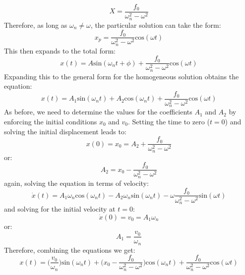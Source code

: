 \documentclass[12pt,letter]{article}
\numberwithin{ex}{section} %
\numberwithin{re}{section} %
\numberwithin{vcs}{section} %
\begin{document}
			\begin{equation}
				X = \frac{f_0}{\omega_n^2-\omega^2}
				\label{eq:X}
			\end{equation}		
			Therefore, as long as $\omega_n \neq \omega$, the particular solution can take the form:
			\begin{equation}
				x_p = \frac{f_0}{\omega_n^2-\omega^2}\text{cos}(\omega t)
			\end{equation}						
			This then expands to the total form:
			\begin{equation}
				x(t) = A\text{sin}(\omega_n t + \phi) + \frac{f_0}{\omega_n^2-\omega^2}\text{cos}(\omega t)
			\end{equation}				
			Expanding this to the general form for the homogeneous solution obtains the equation:
			\begin{equation}
				x(t) = A_1\text{sin}(\omega_n t) + A_2\text{cos}(\omega_n t) + \frac{f_0}{\omega_n^2-\omega^2}\text{cos}(\omega t)
			\end{equation}				
			As before, we need to determine the values for the coefficients $A_1$ and $A_2$ by enforcing the initial conditions $x_0$ and $v_0$. Setting the time to zero ($t=0$) and solving the initial displacement leads to:
			\begin{equation}
				x(0) = x_0 = A_2 + \frac{f_0}{\omega_n^2-\omega^2}
			\end{equation}				
			or:
			\begin{equation}
				A_2 = x_0-\frac{f_0}{\omega_n^2-\omega^2}
			\end{equation}	
			again, solving the equation in terms of velocity:
			\begin{equation}
				\dot{x}(t) = A_1\omega_n\text{cos}(\omega_n t) - A_2 \omega_n \text{sin}(\omega_n t) - \omega \frac{f_0}{\omega_n^2-\omega^2}\text{sin}(\omega t)
			\end{equation}	
			and solving for the initial velocity at $t=0$:
			\begin{equation}
				\dot{x}(0) = v_0 =  A_1 \omega_n
			\end{equation}				
			or:
			\begin{equation}
				A_1 = \frac{v_0}{\omega_n}
			\end{equation}				
			Therefore, combining the equations we get:
			\begin{equation}
				x(t) = \Big(\frac{v_0}{\omega_n}\Big)\text{sin}(\omega_n t) + \Big(x_0-\frac{f_0}{\omega_n^2-\omega^2}\Big)\text{cos}(\omega_n t) + \frac{f_0}{\omega_n^2-\omega^2}\text{cos}(\omega t)
			\end{equation}	
\end{document}
